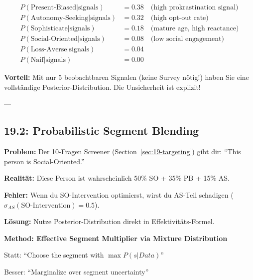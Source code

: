 \begin{equation}
\begin{aligned}
P(\text{Present-Biased} | \text{signals}) &= 0.38 \quad \text{(high prokrastination signal)} \\
P(\text{Autonomy-Seeking} | \text{signals}) &= 0.32 \quad \text{(high opt-out rate)} \\
P(\text{Sophisticate} | \text{signals}) &= 0.18 \quad \text{(mature age, high reactance)} \\
P(\text{Social-Oriented} | \text{signals}) &= 0.08 \quad \text{(low social engagement)} \\
P(\text{Loss-Averse} | \text{signals}) &= 0.04 \\
P(\text{Naif} | \text{signals}) &= 0.00
\end{aligned}
\end{equation}

\textbf{Vorteil:} Mit nur 5 beobachtbaren Signalen (keine Survey nötig!) haben Sie eine vollständige Posterior-Distribution. Die Unsicherheit ist explizit!

---

\subsection{19.2: Probabilistic Segment Blending}
\label{subsec:19-llmmc-blending}

\begin{tcolorbox}[colback=orange!5!white, colframe=orange!75!black, title=\textbf{Das Problem: Hard Segmentation ignoriert Realität}]

\textbf{Problem:} Der 10-Fragen Screener (Section~\ref{sec:19-targeting}) gibt dir: ``This person is Social-Oriented.''

\textbf{Realität:} Diese Person ist wahrscheinlich 50\% SO + 35\% PB + 15\% AS.

\textbf{Fehler:} Wenn du SO-Intervention optimierst, wirst du AS-Teil schadigen ($\sigma_{AS}(\text{SO-Intervention}) = 0.5$).

\textbf{Lösung:} Nutze Posterior-Distribution direkt in Effektivitäts-Formel.

\end{tcolorbox}

\textbf{Method: Effective Segment Multiplier via Mixture Distribution}

Statt: ``Choose the segment with $\max P(s | Data)$''

Besser: ``Marginalize over segment uncertainty''

